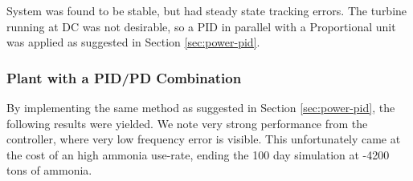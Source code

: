 System was found to be stable, but had steady state tracking errors.
The turbine running at DC was not desirable, so a PID in parallel with a Proportional unit was applied as suggested in Section \ref{sec:power-pid}.











\subsubsection{Plant with a PID/PD Combination}

By implementing the same method as suggested in Section \ref{sec:power-pid}, the following results were yielded.
We note very strong performance from the controller, where very low frequency error is visible.
This unfortunately came at the cost of an high ammonia use-rate, ending the 100 day simulation at -4200 tons of ammonia.

